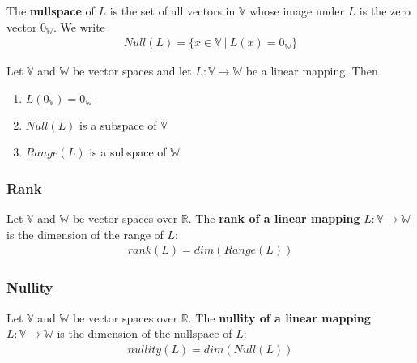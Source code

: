 \documentclass[a4paper,9pt]{extarticle}
\begin{document}
\begin{multicols*}{2}
\noindent The \textbf{nullspace} of $L$ is the set of all vectors in $\mathbb{V}$ whose image under $L$ is the zero vector $0_{\mathbb{W}}$. We write
\begin{equation} \label{4.5-2}
    \begin{split}
        Null(L) = \{x \in \mathbb{V} \> | \> L(x) = 0_{\mathbb{W}}\}
    \end{split}
\end{equation}

Let $\mathbb{V}$ and $\mathbb{W}$ be vector spaces and let $L : \mathbb{V} \to \mathbb{W}$ be a linear mapping. Then
\begin{enumerate}[label=\bfseries (\arabic*)] \itemsep0pt \parskip0pt 
    \item $L(0_{\mathbb{V}}) = 0_{\mathbb{W}}$
    \item $Null(L)$ is a subspace of $\mathbb{V}$
    \item $Range(L)$ is a subspace of $\mathbb{W}$
\end{enumerate}


\subsubsection{Rank}
Let $\mathbb{V}$ and $\mathbb{W}$ be vector spaces over $\mathbb{R}$. The \textbf{rank of a linear mapping} $L: \mathbb{V} \to \mathbb{W}$ is the dimension of the range of $L$:
\begin{equation} \label{4.5-3}
    \begin{split}
        rank(L) = dim(Range(L))
    \end{split}
\end{equation}


\subsubsection{Nullity}
Let $\mathbb{V}$ and $\mathbb{W}$ be vector spaces over $\mathbb{R}$. The \textbf{nullity of a linear mapping} $L: \mathbb{V} \to \mathbb{W}$ is the dimension of the nullspace of $L$:
\begin{equation} \label{4.5-4}
    \begin{split}
        nullity(L) = dim(Null(L))
    \end{split}
\end{equation}


\end{multicols*}
\end{document}
